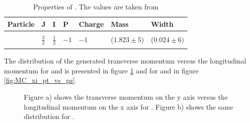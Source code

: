 \begin{table}[bp]
	\centering
	\caption{Properties of \excitedcascade. The values are taken from \cite{PDG}}
	\label{tab:eventgeneration_Xivalues}
	\begin{tabular}{lllllll}
		\hline
		Particle & J & I & P & Charge & Mass  & Width \\
		\hline
		\hline
		&&&&&&\\
		\excitedcascade & $\frac{3}{2}$ & $\frac{1}{2}$ & $-1$ & $-1$ & ($1.823 \pm 5$) \massunit & ($0.024 \pm 6) $ \massunit \\
		&&&&&&\\
		\hline
		  
	\end{tabular}
\end{table}

The distribution of the generated transverse momentum versus the longitudinal momentum for \lam and \alam is presented in figure \ref{fig:MC_lambda0_pt_vs_pz} and for \anticascade and \excitedcascade in figure \ref{fig:MC_xi_pt_vs_pz}.\\


\begin{figure}
	\caption{\propose Figure a) shows the transverse momentum on the y axis versus the longitudinal momentum on the x axis for \lam. Figure b) 
			shows the same distribution for \alam.}
	\label{fig:MC_lambda0_pt_vs_pz}
\end{figure}


